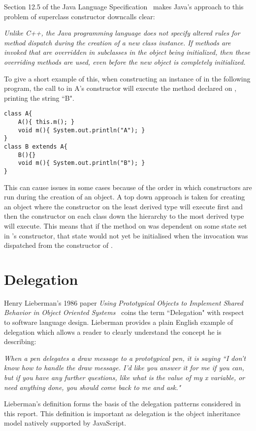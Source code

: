 Section 12.5 of the Java Language Specification~\cite{JavaLangSpec} makes Java's approach to this problem of superclass constructor downcalls clear:
\begin{displayquote}\textit{
		Unlike C++, the Java programming language does not specify altered rules for method dispatch during the creation of a new class instance. If methods are invoked that are overridden in subclasses in the object being initialized, then these overriding methods are used, even before the new object is completely initialized.~\cite{JavaLangSpec}}
\end{displayquote}
To give a short example of this, when constructing an instance of  in the following program, the call to  in A's constructor will execute the method  declared on , printing the string ``B".
\begin{lstlisting}
class A{
	A(){ this.m(); }
	void m(){ System.out.println("A"); }
}
class B extends A{
	B(){}
	void m(){ System.out.println("B"); }
}
\end{lstlisting}
This can cause issues in some cases because of the order in which constructors are run during the creation of an object. A top down approach is taken for creating an object where the constructor on the least derived type will execute first and then the constructor on each class down the hierarchy to the most derived type will execute. This means that if the  method on  was dependent on some state set in 's constructor, that state would not yet be initialised when the invocation was dispatched from the constructor of .

\section{Delegation}
Henry Lieberman's 1986 paper \textit{Using Prototypical Objects to Implement Shared Behavior in Object Oriented Systems~\cite{UsingPrototypicalObjects}} coins the term ``Delegation" with respect to software language design. Lieberman provides a plain English example of delegation which allows a reader to clearly understand the concept he is describing:
\begin{displayquote}\textit{
		When a pen delegates a draw message to a prototypical pen, it is saying ``I don't know how to handle the draw message. I'd like you answer it for me if you can, but if you have any further questions, like what is the value of my x variable, or need anything done, you should come back to me and ask."~\cite{UsingPrototypicalObjects}}
\end{displayquote}
Lieberman's definition forms the basis of the delegation patterns considered in this report. This definition is important as delegation is the object inheritance model natively supported by JavaScript.
\newline

